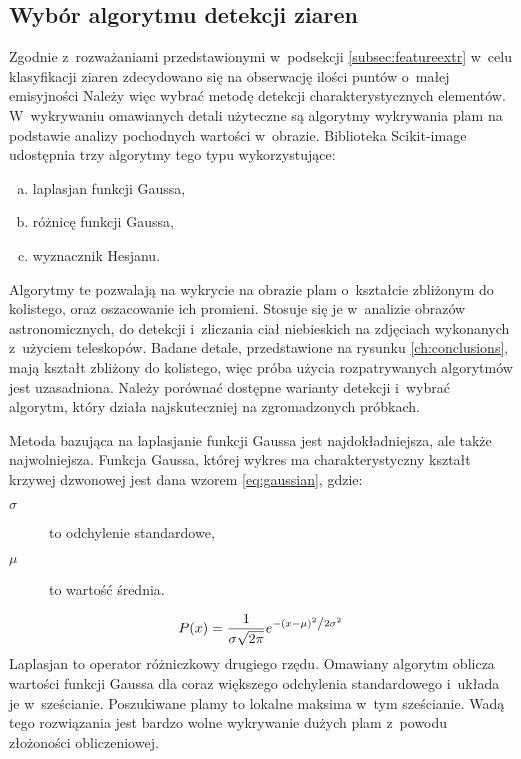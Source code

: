\subsection{Wybór algorytmu detekcji ziaren}
\label{subsec:blobdetect}
Zgodnie z~rozważaniami przedstawionymi w~podsekcji \ref{subsec:featureextr}
w~celu klasyfikacji ziaren zdecydowano się na obserwację ilości puntów
o~małej emisyjności
Należy więc wybrać metodę detekcji charakterystycznych elementów.
W~wykrywaniu omawianych detali użyteczne są algorytmy wykrywania plam na
podstawie analizy pochodnych wartości w~obrazie.
Biblioteka Scikit-image udostępnia trzy algorytmy tego typu wykorzystujące:
\begin{enumerate}[a)]
	\item laplasjan funkcji Gaussa,
	\item różnicę funkcji Gaussa,
	\item wyznacznik Hesjanu.
\end{enumerate}
Algorytmy te pozwalają na wykrycie na obrazie plam o~kształcie zbliżonym
do kolistego, oraz oszacowanie ich promieni.
Stosuje się je w~analizie obrazów astronomicznych, do detekcji
i~zliczania ciał niebieskich na zdjęciach wykonanych z~użyciem teleskopów.
Badane detale, przedstawione na rysunku \ref{ch:conclusions},
mają kształt zbliżony do kolistego, więc próba użycia rozpatrywanych
algorytmów jest uzasadniona.
Należy porównać dostępne warianty detekcji i~wybrać algorytm, który
działa najskuteczniej na zgromadzonych próbkach.

Metoda bazująca na laplasjanie funkcji Gaussa jest najdokładniejsza, ale
także najwolniejsza.
Funkcja Gaussa, której wykres ma charakterystyczny kształt krzywej dzwonowej
jest dana wzorem \ref{eq:gaussian}, gdzie:
\begin{description}
	\item[$ \sigma $] to odchylenie standardowe,
	\item[$ \mu $] to wartość średnia.
\end{description}
\begin{equation}
	P(x) = \frac{1}{{\sigma \sqrt {2\pi } }}
	e^{{{ - \left( {x - \mu } \right)^2 }
	\mathord{\left/ {\vphantom {{ - \left( {x - \mu } \right)^2 }
	{2\sigma ^2 }}} \right. \kern-\nulldelimiterspace} {2\sigma ^2 }}}
\label{eq:gaussian}
\end{equation}
Laplasjan to operator różniczkowy drugiego rzędu.
Omawiany algorytm oblicza wartości funkcji Gaussa dla coraz większego
odchylenia standardowego i~układa je w~sześcianie.
Poszukiwane plamy to lokalne maksima w~tym sześcianie.
Wadą tego rozwiązania jest bardzo wolne wykrywanie dużych plam z~powodu
złożoności obliczeniowej.

